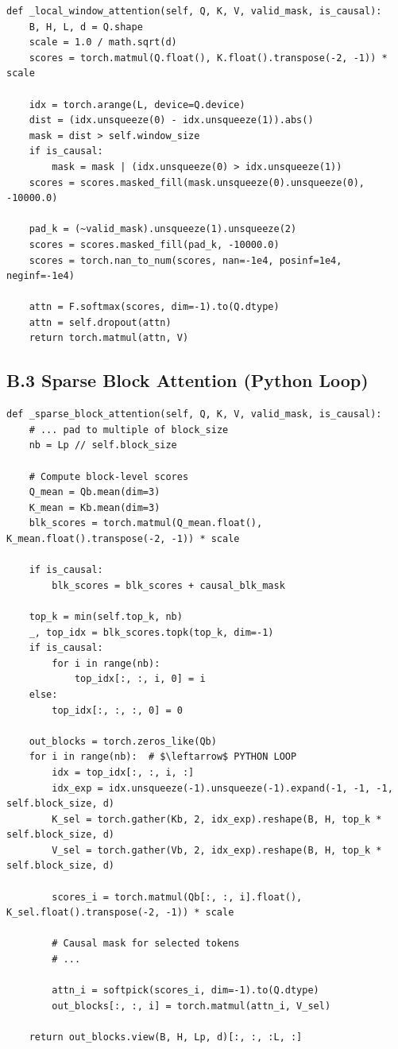 \begin{lstlisting}
def _local_window_attention(self, Q, K, V, valid_mask, is_causal):
    B, H, L, d = Q.shape
    scale = 1.0 / math.sqrt(d)
    scores = torch.matmul(Q.float(), K.float().transpose(-2, -1)) * scale
    
    idx = torch.arange(L, device=Q.device)
    dist = (idx.unsqueeze(0) - idx.unsqueeze(1)).abs()
    mask = dist > self.window_size
    if is_causal:
        mask = mask | (idx.unsqueeze(0) > idx.unsqueeze(1))
    scores = scores.masked_fill(mask.unsqueeze(0).unsqueeze(0), -10000.0)
    
    pad_k = (~valid_mask).unsqueeze(1).unsqueeze(2)
    scores = scores.masked_fill(pad_k, -10000.0)
    scores = torch.nan_to_num(scores, nan=-1e4, posinf=1e4, neginf=-1e4)
    
    attn = F.softmax(scores, dim=-1).to(Q.dtype)
    attn = self.dropout(attn)
    return torch.matmul(attn, V)
\end{lstlisting}

\subsection{B.3 Sparse Block Attention (Python Loop)}

\begin{lstlisting}
def _sparse_block_attention(self, Q, K, V, valid_mask, is_causal):
    # ... pad to multiple of block_size
    nb = Lp // self.block_size
    
    # Compute block-level scores
    Q_mean = Qb.mean(dim=3)
    K_mean = Kb.mean(dim=3)
    blk_scores = torch.matmul(Q_mean.float(), K_mean.float().transpose(-2, -1)) * scale
    
    if is_causal:
        blk_scores = blk_scores + causal_blk_mask
    
    top_k = min(self.top_k, nb)
    _, top_idx = blk_scores.topk(top_k, dim=-1)
    if is_causal:
        for i in range(nb):
            top_idx[:, :, i, 0] = i
    else:
        top_idx[:, :, :, 0] = 0
    
    out_blocks = torch.zeros_like(Qb)
    for i in range(nb):  # $\leftarrow$ PYTHON LOOP
        idx = top_idx[:, :, i, :]
        idx_exp = idx.unsqueeze(-1).unsqueeze(-1).expand(-1, -1, -1, self.block_size, d)
        K_sel = torch.gather(Kb, 2, idx_exp).reshape(B, H, top_k * self.block_size, d)
        V_sel = torch.gather(Vb, 2, idx_exp).reshape(B, H, top_k * self.block_size, d)
        
        scores_i = torch.matmul(Qb[:, :, i].float(), K_sel.float().transpose(-2, -1)) * scale
        
        # Causal mask for selected tokens
        # ... 
        
        attn_i = softpick(scores_i, dim=-1).to(Q.dtype)
        out_blocks[:, :, i] = torch.matmul(attn_i, V_sel)
    
    return out_blocks.view(B, H, Lp, d)[:, :, :L, :]
\end{lstlisting}

